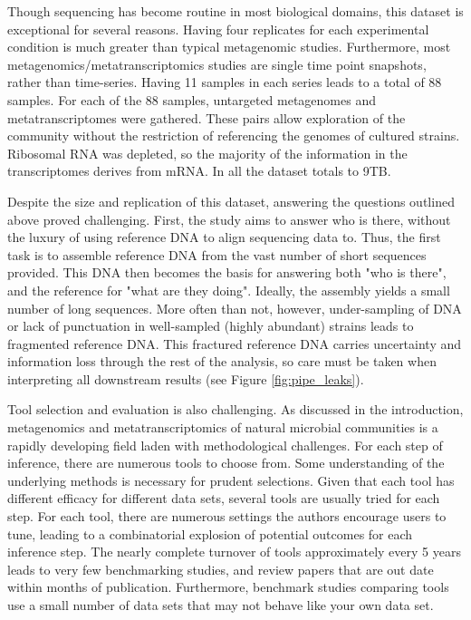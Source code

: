 Though sequencing has become routine in most biological domains, this dataset is exceptional for several reasons.
Having four replicates for each experimental condition is much greater than typical metagenomic studies.
Furthermore, most metagenomics/metatranscriptomics studies are single time point snapshots, rather than time-series.
Having 11 samples in each series leads to a total of 88 samples.
For each of the 88 samples, untargeted metagenomes and metatranscriptomes were gathered.
These pairs allow exploration of the community without the restriction of referencing the genomes of cultured strains.
Ribosomal RNA was depleted, so the majority of the information in the transcriptomes derives from mRNA.
In all the dataset totals to 9TB.

Despite the size and replication of this dataset, answering the questions outlined above proved challenging.
First, the study aims to answer who is there, without the luxury of using reference DNA to align sequencing data to.
Thus, the first task is to assemble reference DNA from the vast number of short sequences provided.
This DNA then becomes the basis for answering both "who is there", and the reference for "what are they doing".
Ideally, the assembly yields a small number of long sequences.
More often than not, however, under-sampling of DNA or lack of punctuation in well-sampled (highly abundant) strains leads to fragmented reference DNA.
This fractured reference DNA carries uncertainty and information loss through the rest of the analysis, so care must be taken when interpreting all downstream results (see Figure \ref{fig:pipe_leaks}).

Tool selection and evaluation is also challenging.
As discussed in the introduction, metagenomics and metatranscriptomics of natural microbial communities is a rapidly developing field laden with methodological challenges.
For each step of inference, there are numerous tools to choose from.
Some understanding of the underlying methods is necessary for prudent selections.
Given that each tool has different efficacy for different data sets, several tools are usually tried for each step.
For each tool, there are numerous settings the authors encourage users to tune, leading to a combinatorial explosion of potential outcomes for each inference step.
The nearly complete turnover of tools approximately every 5 years leads to very few benchmarking studies, and review papers that are out date within months of publication.
Furthermore, benchmark studies comparing tools use a small number of data sets that may not behave like your own data set.

